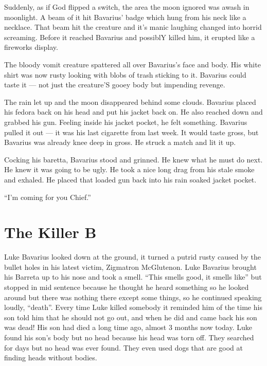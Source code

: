 Suddenly, as if God flipped a switch, the area the moon ignored was
awash in moonlight. A beam of it hit Bavarius' badge which hung
from his neck like a necklace. That beam hit the creature and it's
manic laughing changed into horrid screaming. Before it reached
Bavarius and possiblY killed him, it erupted like a fireworks
display.



The bloody vomit creature spattered all over Bavarius's face and
body. His white shirt was now rusty looking with blobs of trash
sticking to it. Bavarius could taste it --- not just the
creature'S gooey body but impending revenge.



The rain let up and the moon disappeared behind some clouds.
Bavarius placed his fedora back on his head and put his jacket back
on. He also reached down and grabbed his gun. Feeling inside his
jacket pocket, he felt something. Bavarius pulled it out --- it
was his last cigarette from last week. It would taste gross, but
Bavarius was already knee deep in gross. He struck a match and lit
it up.



Cocking his baretta, Bavarius stood and grinned. He knew what he
must do next. He knew it was going to be ugly. He took a nice long
drag from his stale smoke and exhaled. He placed that loaded gun
back into his rain soaked jacket pocket.



``I'm coming for you Chief.'' 

 



\chapter{The Killer B}





Luke Bavarius looked down at the ground, it turned a putrid rusty
caused by the bullet holes in his latest victim, Zigmatron
McGlutenon. Luke Bavarius brought his Barreta up to his nose and
took a smell. ``This smells good, it smells like'' but
stopped in mid sentence because he thought he heard something so he
looked around but there was nothing there except some things, so he
continued speaking loudly, ``death''. Every time Luke
killed somebody it reminded him of the time his son told him that
he should not go out, and when he did and came back his son was
dead! His son had died a long time ago, almost 3 months now today.
Luke found his son's body but no head because his head was torn
off. They searched for days but no head was ever found. They even
used dogs that are good at finding heads without bodies.



